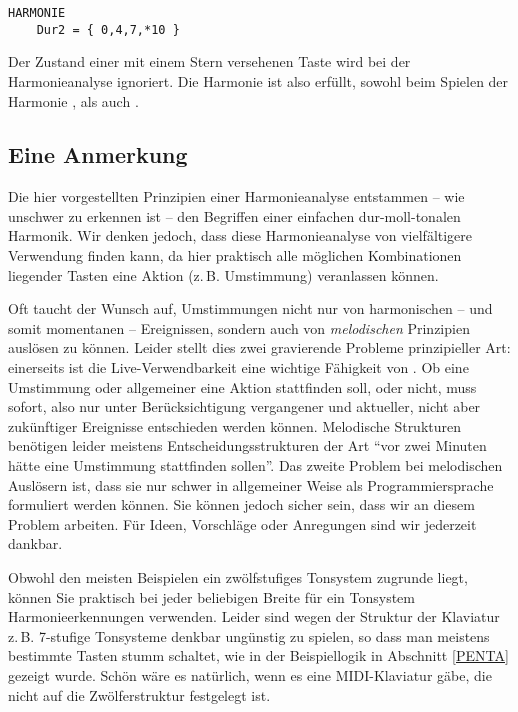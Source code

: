 \begin{verbatim}
HARMONIE
    Dur2 = { 0,4,7,*10 }
\end{verbatim}

Der Zustand einer mit einem Stern versehenen Taste wird bei der
Harmonieanalyse ignoriert. Die Harmonie  ist also erfüllt,
sowohl beim Spielen der Harmonie , als auch .

\subsection{Eine Anmerkung}\label{sec:eine-anmerkung}
Die hier vorgestellten Prinzipien einer Harmonieanalyse entstammen --
wie unschwer zu erkennen ist -- den Begriffen einer einfachen
dur-moll-tonalen Harmonik. Wir denken jedoch, dass diese
Harmonieanalyse von \mutabor{} vielfältigere Verwendung finden kann,
da hier praktisch alle möglichen Kombinationen liegender Tasten eine
Aktion (z.\,B. Umstimmung) veranlassen können.

Oft taucht der Wunsch auf, Umstimmungen nicht nur von harmonischen --
und somit momentanen -- Ereignissen, sondern auch von {\em
  melodischen} Prinzipien auslösen zu
können. Leider stellt dies zwei gravierende Probleme prinzipieller
Art: einerseits ist die Live-Verwendbarkeit eine wichtige Fähigkeit
von \mutabor{}. Ob eine Umstimmung oder allgemeiner eine Aktion
stattfinden soll, oder nicht, muss sofort, also nur unter
Berücksichtigung vergangener und aktueller, nicht aber zukünftiger
Ereignisse entschieden werden können. Melodische Strukturen benötigen
leider meistens Entscheidungsstrukturen der Art "`vor zwei Minuten
hätte eine Umstimmung stattfinden sollen"'. Das zweite Problem bei
melodischen Auslösern ist, dass sie nur schwer in allgemeiner Weise als
Programmiersprache formuliert werden können. Sie können jedoch sicher
sein, dass wir an diesem Problem arbeiten. Für Ideen, Vorschläge oder
Anregungen sind wir jederzeit dankbar.


Obwohl den meisten Beispielen ein zwölfstufiges Tonsystem zugrunde
liegt, können Sie praktisch bei jeder beliebigen Breite für ein
Tonsystem Harmonieerkennungen verwenden. Leider sind wegen der
Struktur der Klaviatur z.\,B. 7-stufige Tonsysteme denkbar ungünstig zu
spielen, so dass man meistens bestimmte Tasten stumm schaltet, wie in
der Beispiellogik  in Abschnitt \ref{PENTA} gezeigt
wurde. Schön wäre es natürlich, wenn es eine MIDI-Klaviatur gäbe, die
nicht auf die Zwölferstruktur festgelegt ist.

